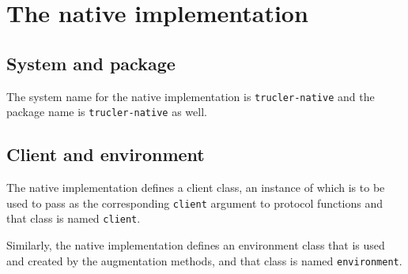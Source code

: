 \chapter{The native implementation}

\section{System and package}

The \asdf{} system name for the native implementation is
\texttt{trucler-native} and the package name is
\texttt{trucler-native} as well.

\section{Client and environment}

The native implementation defines a client class, an instance of
which is to be used to pass as the corresponding \texttt{client}
argument to protocol functions and that class is named
\texttt{client}.

Similarly, the native implementation defines an environment class that
is used and created by the augmentation methods, and that class is
named \texttt{environment}.
